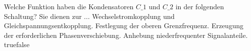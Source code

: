     {Welche Funktion haben die Kondensatoren $C\_1$ und $C\_2$ in der folgenden Schaltung? Sie dienen zur ...}
    {Wechselstromkopplung und Gleichspannungsentkopplung.}
    {Festlegung der oberen Grenzfrequenz.}
    {Erzeugung der erforderlichen Phasenverschiebung.}
    {Anhebung niederfrequenter Signalanteile.}
    {true}{false}